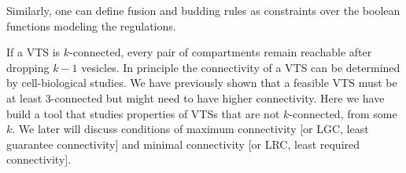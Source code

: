 Similarly, one can define fusion and budding rules as constraints over the boolean functions modeling the regulations.  
%

If a VTS is $k$-connected, every pair of compartments remain reachable after dropping $k-1$ vesicles. In principle the connectivity of a VTS can be determined by cell-biological studies. We have previously shown \cite{shukla} that a feasible VTS must be at least 3-connected but might need to have higher connectivity. Here we have build a tool that studies properties of VTSs that are not $k$-connected, from some $k$. We later will discuss conditions of maximum connectivity [or LGC, least guarantee connectivity] and minimal connectivity [or LRC, least required connectivity].


